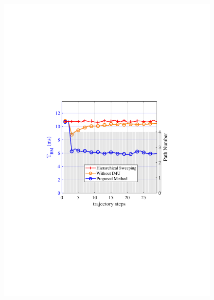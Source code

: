 \documentclass[journal,12pt,onecolumn,draftclsnofoot,]{IEEEtran}
\begin{document}
\begin{figure}
{\hspace{-4.5mm}\includegraphics[scale=0.46]{9-3.pdf}\hspace{-5mm}
}
\quad
\subfloat[]{
}
\end{figure}
\end{document}
